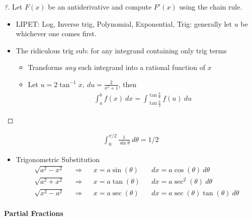 \begin{proof}[?]

Let \(F(x)\) be an antiderivative and compute \(F'(x)\) using the chain
rule.


\begin{itemize}
\item
  LIPET: Log, Inverse trig, Polynomial, Exponential, Trig: generally let
  \(u\) be whichever one comes first.
\item
  The ridiculous trig sub: for any integrand containing only trig terms

  \begin{itemize}
  \item
    Transforms \emph{any} such integrand into a rational function of
    \(x\)
  \item
    Let \(u = 2\tan^{-1}x, ~du = \frac{2}{x^2+1}\), then
    \begin{align*}
    \int_a^b f(x)~dx = \int_{\tan\frac{a}{2}}^{\tan\frac{b}{2}} f(u)~du
    \end{align*}
  \end{itemize}
\end{itemize}

\end{proof}

\begin{example}[?]

\begin{align*}
\int_0^{\pi/2} \frac{1}{\sin \theta}~d\theta = 1/2
\end{align*}

\end{example}

\begin{itemize}
\tightlist
\item
  Trigonometric Substitution
  \begin{align*}
  \sqrt{a^2-x^2} && \Rightarrow && x = a\sin(\theta) &&dx = a\cos(\theta)~d\theta \\
  \sqrt{a^2+x^2} && \Rightarrow && x = a\tan(\theta) &&dx = a\sec^2(\theta)~d\theta \\
  \sqrt{x^2 - a^2} && \Rightarrow && x = a \sec(\theta) &&dx = a\sec(\theta)\tan(\theta)~d\theta
  \end{align*}
\end{itemize}

\hypertarget{partial-fractions}{%
\paragraph{Partial Fractions}\label{partial-fractions}}

